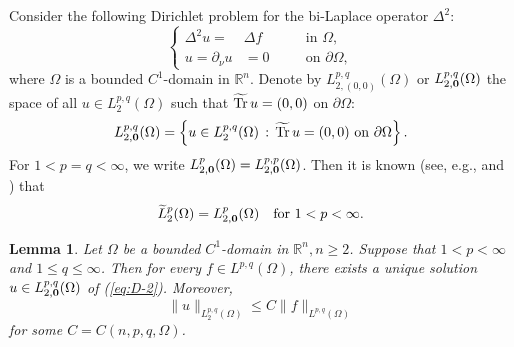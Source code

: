 \documentclass[reqno,centertags,11pt]{amsart}
\newtheorem{lem}[thm]{Lemma}
\theoremstyle{definition}
\numberwithin{thm}{section}
\numberwithin{equation}{section}
\newcommand{\R}{{\mathbb{R}}}
\begin{document}
Consider the following Dirichlet problem for the bi-Laplace operator $\Delta^2$:
\begin{equation}\label{eq:D-2}
\left\{\begin{alignedat}{2}
 \Delta^2 u =  & \Delta  f & \quad & \text{in }\Omega,\\
  u   = \partial_\nu u & = 0 & \quad & \text{on }\partial\Omega  ,
\end{alignedat}\right.
\end{equation}
where $\Omega$ is a bounded $C^{1}$-domain  in $\R^n$.
Denote by $L^{p,q}_{2,(0,0)}(\Omega) $ or  $L^{p,q}_{2,{\bf 0}}(\Omega)$ the space of all $u\in L^{p,q}_{2}(\Omega)$ such that $ \widetilde{\rm Tr}\, u= (0,0)$ on $\partial\Omega$:
$$
L^{p,q}_{2,{\bf 0}}(\Omega) = \left\{u\in L^{p,q}_{2}(\Omega)\, :\, \widetilde{\rm Tr}\, u= (0,0) \text{ on }\partial\Omega \right\}.
$$
For $1<p=q<\infty$, we write $L^{p}_{2,{\bf 0}}(\Omega) = L^{p, p}_{2,{\bf 0}}(\Omega)$. Then it is known  (see, e.g., \cite[Subsection 2.5.7]{Ne} and  \cite[Proposition 1.14]{AP98}) that
\[%
\widetilde{L}^{p}_{2}(\Omega) = L^{p}_{2 ,
{\bf 0}}(\Omega)  \quad \mbox{for}\,\, 1< p< \infty .
\]%



\begin{lem}\label{biharmonic-S spaces}
Let $\Omega$ be a bounded $C^{1}$-domain in $\R^n , n \ge 2$. Suppose  that $1<p<\infty$ and $1 \le q \le \infty$.
Then for every $f\in L^{p,q}(\Omega )$, there exists a unique solution $u\in L_{2,{\bf 0}}^{p,q}(\Omega )$ of (\ref{eq:D-2}). Moreover,
\[
\|u\|_{L_{2}^{p,q}(\Omega )} \le C  \|f\|_{L^{p,q}(\Omega  )}
\]
for some $C=C(n,p,q,  \Omega )$.
\end{lem}
\end{document}
